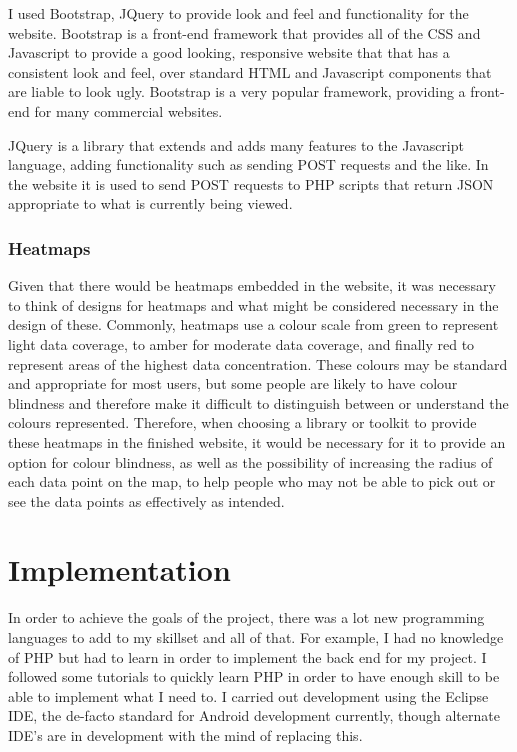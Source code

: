 \documentclass{l4proj}
\begin{document}
I used Bootstrap, JQuery to provide look and feel and functionality for the website. Bootstrap is a front-end framework that provides all of the CSS and Javascript to provide a good looking, responsive website that that has a consistent look and feel, over standard HTML and Javascript components that are liable to look ugly. Bootstrap is a very popular framework, providing a front-end for many commercial websites.

JQuery is a library that extends and adds many features to the Javascript language, adding functionality such as sending POST requests and the like. In the website it is used to send POST requests to PHP scripts that return JSON appropriate to what is currently being viewed.

\subsection{Heatmaps}

Given that there would be heatmaps embedded in the website, it was necessary to think of designs for heatmaps and what might be considered necessary in the design of these. Commonly, heatmaps use a colour scale from green to represent light data coverage, to amber for moderate data coverage, and finally red to represent areas of the highest data concentration. These colours may be standard and appropriate for most users, but some people are likely to have colour blindness and therefore make it difficult to  distinguish between or understand the colours represented. Therefore, when choosing a library or toolkit to provide these heatmaps in the finished website, it would be necessary for it to provide an option for colour blindness, as well as the possibility of increasing the radius of each data point on the map, to help people who may not be able to pick out or see the data points as effectively as intended.


\chapter{Implementation}

In order to achieve the goals of the project, there was a lot new programming languages to add to my skillset and all of that. For example, I had no knowledge of PHP but had to learn in order to implement the back end for my project. I followed some tutorials to quickly learn PHP in order to have enough skill to be able to implement what I need to. I carried out development using the Eclipse IDE, the de-facto standard for Android development currently, though alternate IDE's are in development with the mind of replacing this.
\end{document}
